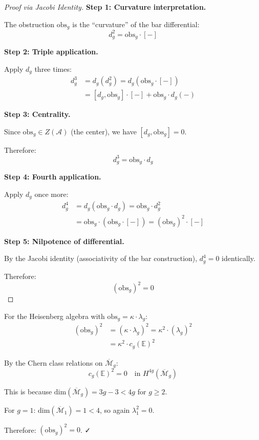 \begin{proof}[Proof via Jacobi Identity]

\textbf{Step 1: Curvature interpretation.}

The obstruction $\text{obs}_g$ is the ``curvature'' of the bar differential:
$$d_g^2 = \text{obs}_g \cdot [-]$$

\textbf{Step 2: Triple application.}

Apply $d_g$ three times:
\begin{align}
d_g^3 &= d_g(d_g^2) = d_g(\text{obs}_g \cdot [-]) \\
&= [d_g, \text{obs}_g] \cdot [-] + \text{obs}_g \cdot d_g(-)
\end{align}

\textbf{Step 3: Centrality.}

Since $\text{obs}_g \in Z(\mathcal{A})$ (the center), we have $[d_g, \text{obs}_g] = 0$.

Therefore:
$$d_g^3 = \text{obs}_g \cdot d_g$$

\textbf{Step 4: Fourth application.}

Apply $d_g$ once more:
\begin{align}
d_g^4 &= d_g(\text{obs}_g \cdot d_g) = \text{obs}_g \cdot d_g^2 \\
&= \text{obs}_g \cdot (\text{obs}_g \cdot [-]) = (\text{obs}_g)^2 \cdot [-]
\end{align}

\textbf{Step 5: Nilpotence of differential.}

By the Jacobi identity (associativity of the bar construction), $d_g^4 = 0$ identically.

Therefore:
$$(\text{obs}_g)^2 = 0$$
\end{proof}

\begin{verification}\label{verif:heisenberg-obs-squares}
For the Heisenberg algebra with $\text{obs}_g = \kappa \cdot \lambda_g$:
\begin{align}
(\text{obs}_g)^2 &= (\kappa \cdot \lambda_g)^2 = \kappa^2 \cdot (\lambda_g)^2 \\
&= \kappa^2 \cdot c_g(\mathbb{E})^2
\end{align}

By the Chern class relations on $\overline{\mathcal{M}}_g$:
$$c_g(\mathbb{E})^2 = 0 \quad \text{in } H^{4g}(\overline{\mathcal{M}}_g)$$

This is because $\text{dim}(\overline{\mathcal{M}}_g) = 3g-3 < 4g$ for $g \geq 2$.

For $g=1$: $\text{dim}(\overline{\mathcal{M}}_1) = 1 < 4$, so again $\lambda_1^2 = 0$.

Therefore: $(\text{obs}_g)^2 = 0$. ✓
\end{verification}

